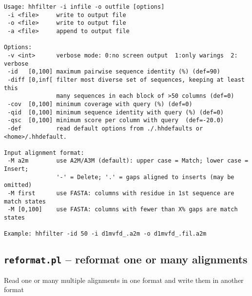\documentclass[11pt,a4paper]{article}
\begin{document}
\small \begin{verbatim}
Usage: hhfilter -i infile -o outfile [options]                  
 -i <file>     write to output file                                       
 -o <file>     write to output file                                       
 -a <file>     append to output file                                      

Options:                                                                  
 -v <int>      verbose mode: 0:no screen output  1:only warings  2: verbose
 -id   [0,100] maximum pairwise sequence identity (%) (def=90)   
 -diff [0,inf[ filter most diverse set of sequences, keeping at least this    
               many sequences in each block of >50 columns (def=0)
 -cov  [0,100] minimum coverage with query (%) (def=0) 
 -qid  [0,100] minimum sequence identity with query (%) (def=0) 
 -qsc  [0,100] minimum score per column with query  (def=-20.0)
 -def          read default options from ./.hhdefaults or <home>/.hhdefault. 

Input alignment format:                                                    
 -M a2m        use A2M/A3M (default): upper case = Match; lower case = Insert;
               '-' = Delete; '.' = gaps aligned to inserts (may be omitted)   
 -M first      use FASTA: columns with residue in 1st sequence are match states
 -M [0,100]    use FASTA: columns with fewer than X% gaps are match states   
                                                                          
Example: hhfilter -id 50 -i d1mvfd_.a2m -o d1mvfd_.fil.a2m          
\end{verbatim} \normalsize

\subsection{{\tt reformat.pl} -- reformat one or many alignments}

Read one or many multiple alignments in one format and write them in another format
\end{document}
